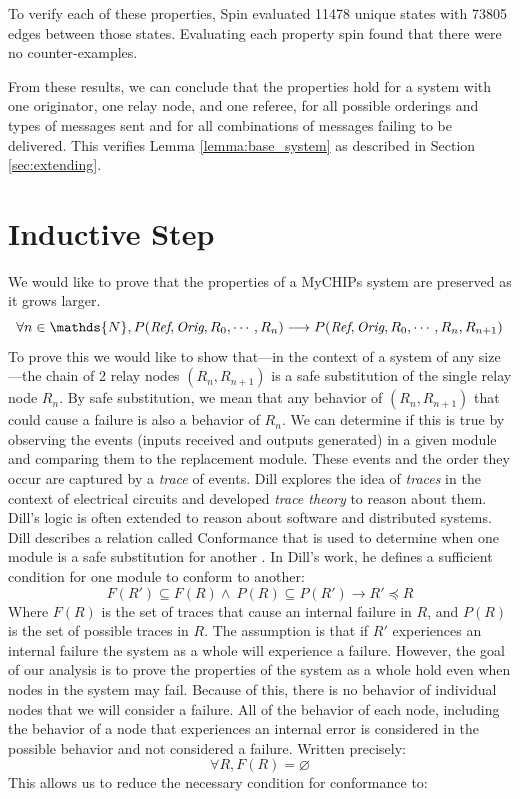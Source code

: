 \documentclass[runningheads]{llncs}
\newif\ifcomments
\newcommand{\krs}[1]{\ifcomments\textcolor{blue}{krs: #1}\fi}
\begin{document}
To verify each of these properties, Spin evaluated 
11478 unique states with 73805 edges between those states. Evaluating each property spin found that there were no counter-examples. 

From these results, we can conclude that the properties hold for a system with one originator, one relay node, and one referee, for all possible orderings and types of messages sent and for all combinations of messages failing to be delivered. This verifies Lemma \ref{lemma:base_system} as described in Section \ref{sec:extending}.

\section{Inductive Step}
\label{sec:inductive_step}

We would like to prove that the properties of a MyCHIPs system are preserved as it grows larger. 
$$
\forall n \in \mathds{N}, P(\emph{Ref}, \emph{Orig}, R_0, \dotsm, R_n) \longrightarrow P(\emph{Ref}, \emph{Orig}, R_0, \dotsm, R_n, R_{n+1})
$$
To prove this we would like to show that---in the context of a system of any size---the chain of 2 relay nodes $(R_n, R_{n+1})$ is a safe substitution of the single relay node $R_n$. By safe substitution, we mean that any behavior of $(R_n, R_{n+1})$ that could cause a failure is also a behavior of $R_n$. We can determine if this is true by observing the events (inputs received and outputs generated) in a given module and comparing them to the replacement module. These events and the order they occur are captured by a \emph{trace} of events. Dill explores the idea of \emph{traces} in the context of electrical circuits and developed \emph{trace theory} to reason about them. Dill's logic is often extended to reason about software and distributed systems. \krs{Add citations here.} Dill describes a relation called Conformance that is used to determine when one module is a safe substitution for another \cite{dill_trace_theory}.
In Dill's work, he defines a sufficient condition for one module to conform to another:
$$F(R') \subseteq F(R) \wedge\ P(R) \subseteq P(R') \longrightarrow R' \preceq R$$
Where $F(R)$ is the set of traces that cause an internal failure in $R$, and $P(R)$ is the set of possible traces in $R$. 
The assumption is that if $R'$ experiences an internal failure the system as a whole will experience a failure. However, the goal of our analysis is to prove the properties of the system as a whole hold even when nodes in the system may fail. Because of this, there is no behavior of individual nodes that we will consider a failure. All of the behavior of each node, including the behavior of a node that experiences an internal error is considered in the possible behavior and not considered a failure. Written precisely:
$$
\forall R, F(R) = \varnothing
$$
This allows us to reduce the necessary condition for conformance to:
\end{document}
